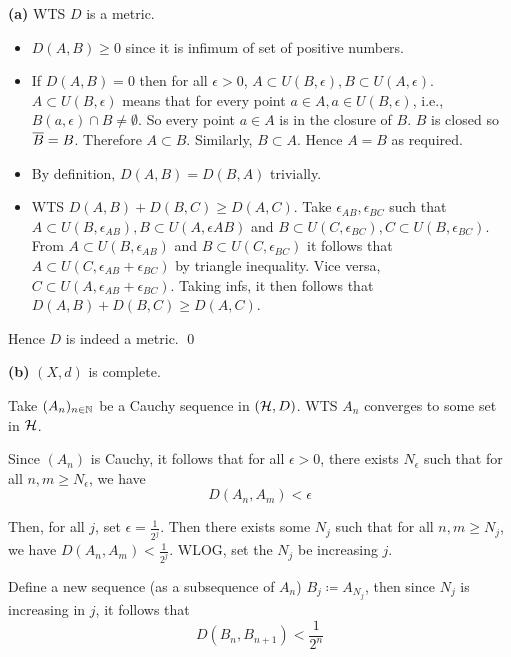 \documentclass[a4paper, 10pt]{article}
\begin{document}
\begin{solution}
    \textbf{(a)} WTS $D$ is a metric.

    \begin{itemize}
    \item $D(A, B) \geq 0$ since it is infimum of set of positive numbers.
    \item If $D(A, B) = 0$ then for all $\epsilon> 0$, $A \subset U(B, \epsilon), B \subset U(A, \epsilon)$. $A \subset U(B, \epsilon)$ means that for every point $a \in A, a \in U(B, \epsilon)$, i.e., $B(a, \epsilon) \cap B \neq \emptyset$. So every point $a \in A$ is in the closure of $B$. $B$ is closed so $\overline{B} = B$. Therefore $A \subset B$. Similarly, $B \subset A$. Hence $A = B$ as required.
    \item By definition, $D(A, B) = D(B, A)$ trivially.
    \item WTS $D(A, B) + D(B, C) \geq D(A, C)$. Take $\epsilon_{AB}, \epsilon_{BC}$ such that $A \subset U(B, \epsilon_{AB}), B \subset U(A, \epsilon{AB})$ and $B \subset U(C, \epsilon_{BC}), C \subset U(B, \epsilon_{BC})$. From $A \subset U(B, \epsilon_{AB})$ and $B \subset U(C, \epsilon_{BC})$ it follows that $A \subset U(C, \epsilon_{AB} + \epsilon_{BC})$ by triangle inequality. Vice versa, $C \subset U(A, \epsilon_{AB} + \epsilon_{BC})$. Taking infs, it then follows that $D(A, B) + D(B, C) \geq D(A, C)$.
    \end{itemize}
    Hence $D$ is indeed a metric. \qed

    \textbf{(b)} $(X, d)$ is complete.

    Take $(A_n)_{n \in \mathbb{N}}$  be a Cauchy sequence in $(\mathcal{H}, D)$. WTS $A_n$ converges to some set in $\mathcal{H}$.

    Since $(A_n)$ is Cauchy, it follows that for all $\epsilon > 0$, there exists $N_{\epsilon}$ such that for all $n, m \geq N_\epsilon$, we have \begin{equation*}
    D(A_n, A_m) < \epsilon
    \end{equation*}

    Then, for all $j$, set $\epsilon = \frac{1}{2^j}$. Then there exists some $N_j$ such that for all $n, m \geq N_j$, we have $D(A_n, A_m) < \frac{1}{2^j}$. WLOG, set the $N_j$ be increasing $j$. 

    Define a new sequence (as a subsequence of $A_n$) $B_j \coloneqq A_{N_j}$, then since $N_j$ is increasing in $j$, it follows that \begin{equation*}
    D(B_n, B_{n+1}) < \frac{1}{2^n}
    \end{equation*}


\end{solution}
\end{document}
